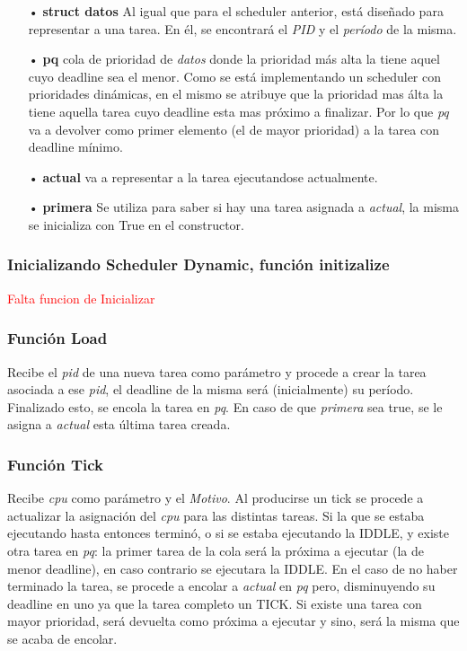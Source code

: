 \documentclass[a4paper]{article}
\begin{document}
	\begin{itemize}
	
	\item[•]\textbf{struct datos} Al igual que para el scheduler anterior, est\'a diseñado para representar a una tarea. En él, se encontrar\'a el \emph{PID} y el \emph{per\'iodo} de la misma.
	\item[•]\textbf{pq} cola de prioridad de \emph{datos} donde la prioridad más alta la tiene aquel cuyo deadline sea el menor. Como se est\'a implementando un scheduler con prioridades dinámicas, en el mismo se atribuye que la prioridad mas álta la tiene aquella tarea cuyo deadline esta mas próximo a finalizar. Por lo que \emph{pq} va a devolver como primer elemento (el de mayor prioridad) a la tarea con deadline m\'inimo.
	\item[•]\textbf{actual} va a representar a la tarea ejecutandose actualmente.
	\item[•]\textbf{primera} Se utiliza para saber si hay una tarea asignada a \emph{actual}, la misma se inicializa con True en el constructor.
	\end{itemize}	
	
\subsubsection*{Inicializando Scheduler Dynamic, función initizalize}		
		
\textcolor{red}{Falta funcion de Inicializar}\\

\subsubsection*{Funci\'on Load}

Recibe el \emph{pid} de una nueva tarea como par\'ametro y procede a crear la tarea asociada a ese \emph{pid}, el deadline de la misma ser\'a (inicialmente) su per\'iodo. Finalizado esto, se encola la tarea en \emph{pq}. En caso de que \emph{primera} sea true, se le asigna a \emph{actual} esta última tarea creada.

\subsubsection*{Funci\'on Tick}	

Recibe \emph{cpu} como par\'ametro y el \emph{Motivo}. Al producirse un tick se procede a actualizar la asignación del \emph{cpu} para las distintas tareas.  Si la que se estaba ejecutando hasta entonces terminó, o si se estaba ejecutando la IDDLE, y existe otra tarea en \emph{pq}: la primer tarea de la cola será la próxima a ejecutar (la de menor deadline), en caso contrario se ejecutara la IDDLE. En el caso de no haber terminado la tarea, se procede a encolar a \emph{actual} en \emph{pq} pero, disminuyendo su deadline en uno ya que la tarea completo un TICK. Si existe una tarea con mayor prioridad, ser\'a devuelta como próxima a ejecutar y sino, ser\'a la misma que se acaba de encolar.  
\end{document}
